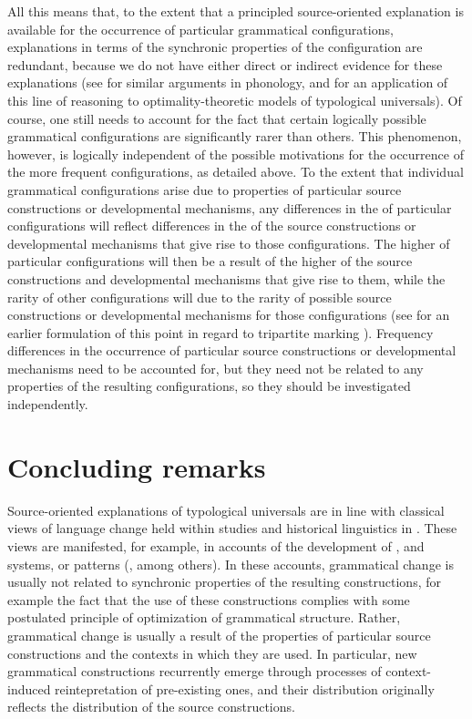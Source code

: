 \documentclass[output=paper]{langsci/langscibook}
\begin{document}
\newpage
All this means that, to the extent that a principled source-oriented
explanation is available for the occurrence of particular grammatical
configurations, explanations in terms of the synchronic properties of
the configuration are redundant, because we do not have either direct
or indirect evidence for these explanations (see \citealt{Blevins2004} for
similar arguments in phonology, and \citealt{Newmeyer2002,Newmeyer2004} for an application of
this line of reasoning to optimality-theoretic models of typological
universals). Of course, one still needs to account for the fact that
certain logically possible grammatical configurations
are significantly rarer than others. This phenomenon, however, is logically
independent of the possible motivations for the occurrence of the more
frequent configurations, as
detailed above. To the extent that
individual grammatical configurations arise due to properties of
particular source constructions or developmental mechanisms, any differences in the  of particular
configurations will reflect differences in the  of
the source constructions or developmental mechanisms that give
rise to those configurations. The higher
 of particular configurations will then  be a result of the higher  of the  source
constructions and developmental mechanisms that give rise to them,
while the rarity of other configurations
will  due to the rarity of possible
source constructions or developmental mechanisms for those
configurations (see \citealt{Harris2008} for an earlier formulation of this point
in regard to tripartite  marking ). Frequency differences in the occurrence of particular source
constructions or developmental mechanisms need to be
accounted for, but they need not be related to any properties of the
resulting configurations, so they should be investigated independently.

\section{Concluding remarks}
Source-oriented explanations of typological universals are  in line with classical
views of language change held within
 studies and historical linguistics in
. These views are manifested, for example, in accounts of the
development of ,  and  systems, or 
patterns (\citealt{BybeeEtAl1994,HarrisCampbell1995,Gildea1998,TraugottDasher2002}, among others). In these accounts, grammatical change
is usually not related to synchronic properties of the resulting
constructions, for example the fact that the use of these
constructions complies with some postulated principle of optimization
of grammatical structure. Rather, grammatical change is usually a result of the properties of particular
source constructions and the contexts in which they are used. In
particular, new grammatical constructions recurrently emerge through
processes of context-induced reintepretation of pre-existing
ones, and their distribution originally reflects the distribution of the
source constructions. 
\end{document}
